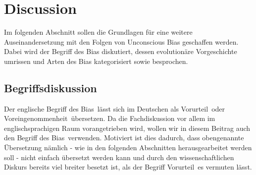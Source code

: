 \newpage
\section{Discussion}
Im folgenden Abschnitt sollen die Grundlagen für eine weitere Auseinandersetzung mit den Folgen von Unconscious Bias geschaffen werden. Dabei wird der Begriff des Bias diskutiert, dessen evolutionäre Vorgeschichte umrissen und Arten des Bias kategorisiert sowie besprochen.\\

\subsection{Begriffsdiskussion}
Der englische Begriff des \glqq Bias\grqq~lässt sich im Deutschen als \glqq Vorurteil\grqq~oder \glqq Voreingenommenheit\grqq~übersetzen. Da die Fachdiskussion vor allem im englischsprachigen Raum vorangetrieben wird, wollen wir in diesem Beitrag auch den Begriff des \glqq Bias\grqq~verwenden. Motiviert ist dies dadurch, dass obengenannte Übersetzung nämlich - wie in den folgenden Abschnitten herausgearbeitet werden soll - nicht einfach übersetzt werden kann und durch den wissenschaftlichen Diskurs bereits viel breiter besetzt ist, als der Begriff \glqq Vorurteil\grqq~es vermuten lässt. \\
